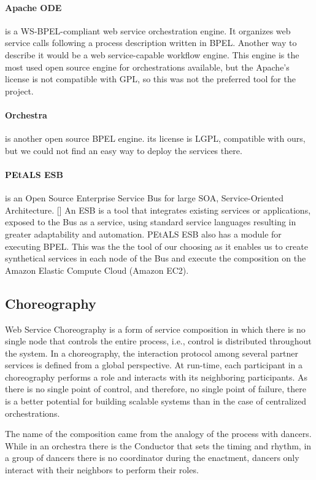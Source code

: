 \paragraph{Apache ODE}
is a WS-BPEL-compliant web service orchestration engine. It organizes web service calls following a process description written in BPEL. Another way to describe it would be a web service-capable workflow engine. This engine is the most used open source engine for orchestrations available, but the Apache's license is not compatible with GPL, so this was not the preferred tool for the project.

\paragraph{Orchestra}
is another open source BPEL engine. its license is LGPL, compatible with ours, but we could not find an easy way to deploy the services there.

\paragraph{PEtALS ESB}
is an Open Source Enterprise Service Bus for large SOA, Service-Oriented Architecture. [\citet{PEtALS}] An ESB is a tool that integrates existing services or applications, exposed to the Bus as a service, using standard service languages resulting in greater adaptability and automation. PEtALS ESB also has a module for executing BPEL. This was the the tool of our choosing as it enables us to create synthetical services in each node of the Bus and execute the composition on the Amazon Elastic Compute Cloud (Amazon EC2).


\subsection{Choreography}
Web Service Choreography is a form of service composition in which there is no single node that controls the entire process, i.e., control is distributed throughout the system. In a choreography, the interaction protocol among several partner services is defined from a global perspective. At run-time, each participant in a choreography performs a role and interacts with its neighboring participants. As there is no single point of control, and therefore, no single point of failure, there is a better potential for building scalable systems than in the case of centralized orchestrations.

The name of the composition came from the analogy of the process with dancers. While in an orchestra there is the Conductor that sets the timing and rhythm, in a group of dancers there is no coordinator during the enactment, dancers only interact with their neighbors to perform their roles.

